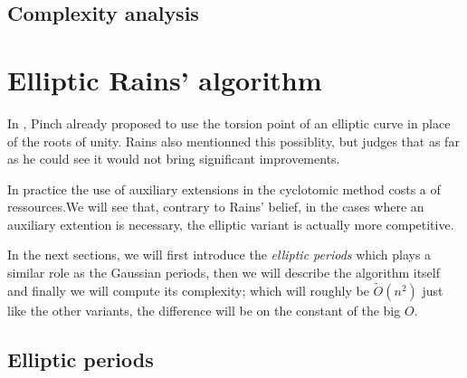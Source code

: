 \documentclass[12pt]{article}
\theoremstyle{plain}
\theoremstyle{definition}
\newcommand{\tildO}{\tilde{O}}
\newcounter{algorithm}
\begin{document}
\subsection{Complexity analysis}



\section{Elliptic Rains' algorithm}

In \cite{Pinch}, Pinch already proposed to use the torsion point of an elliptic
curve in place of the roots of unity. Rains also mentionned this possiblity, 
but judges that as far as he could see it would not bring significant 
improvements.\par 
In practice the use of auxiliary extensions in the cyclotomic method costs a of
ressources.We will see that, contrary to Rains' belief, in the cases where an
auxiliary extention is necessary, the elliptic variant is actually more 
competitive.\par
In the next sections, we will first introduce the \emph{elliptic periods} which 
plays a similar role as the Gaussian periods, then we will describe the
algorithm itself and finally we will compute its complexity; which will
roughly be $\tildO(n^2)$ just like the other variants, the difference will be 
on the constant of the big $O$.

\subsection{Elliptic periods}
\end{document}

